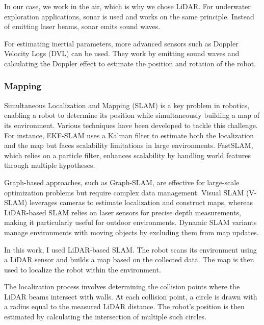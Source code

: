 \documentclass[../main.tex]{subfiles}
\begin{document}
In our case, we work in the air, which is why we chose LiDAR. For underwater exploration applications, sonar is used and works on the same principle. Instead of emitting laser beams, sonar emits sound waves. 

\vspace{0.5em}

For estimating inertial parameters, more advanced sensors such as Doppler Velocity Logs (DVL) can be used. They work by emitting sound waves and calculating the Doppler effect to estimate the position and rotation of the robot.


\subsubsection{Mapping}

Simultaneous Localization and Mapping (SLAM) is a key problem in robotics, enabling a robot to determine its position while simultaneously building a map of its environment. Various techniques have been developed to tackle this challenge. For instance, EKF-SLAM uses a Kalman filter to estimate both the localization and the map but faces scalability limitations in large environments. FastSLAM, which relies on a particle filter, enhances scalability by handling world features through multiple hypotheses.  

\vspace{1em}

Graph-based approaches, such as Graph-SLAM, are effective for large-scale optimization problems but require complex data management. Visual SLAM (V-SLAM) leverages cameras to estimate localization and construct maps, whereas LiDAR-based SLAM relies on laser sensors for precise depth measurements, making it particularly useful for outdoor environments. Dynamic SLAM variants manage environments with moving objects by excluding them from map updates.\cite{ding_2024}

\vspace{1em}

In this work, I used LiDAR-based SLAM. The robot scans its environment using a LiDAR sensor and builds a map based on the collected data. The map is then used to localize the robot within the environment.

\vspace{1em}

The localization process involves determining the collision points where the LiDAR beams intersect with walls. At each collision point, a circle is drawn with a radius equal to the measured LiDAR distance. The robot's position is then estimated by calculating the intersection of multiple such circles.
\end{document}

